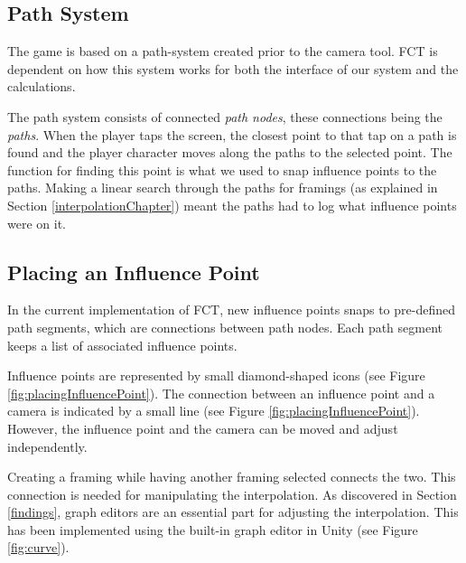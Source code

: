 \subsection{Path System}
The game is based on a path-system created prior to the camera tool. FCT is dependent on how this system works for both the interface of our system and the calculations.

The path system consists of connected \textit{path nodes}, these connections being the \textit{paths}. When the player taps the screen, the closest point to that tap on a path is found and the player character moves along the paths to the selected point. The function for finding this point is what we used to snap influence points to the paths. Making a linear search through the paths for framings (as explained in Section \ref{interpolationChapter}) meant the paths had to log what influence points were on it.

\subsection{Placing an Influence Point}
In the current implementation of FCT, new influence points snaps to pre-defined path segments, which are connections between path nodes. Each path segment keeps a list of associated influence points.


Influence points are represented by small diamond-shaped icons (see Figure \ref{fig:placingInfluencePoint}). The connection between an influence point and a camera is indicated by a small line (see Figure \ref{fig:placingInfluencePoint}). However, the influence point and the camera can be moved and adjust independently.


Creating a framing while having another framing selected connects the two. This connection is needed for manipulating the interpolation. As discovered in Section \ref{findings}, graph editors are an essential part for adjusting the interpolation. This has been implemented using the built-in graph editor in Unity (see Figure \ref{fig:curve}).

